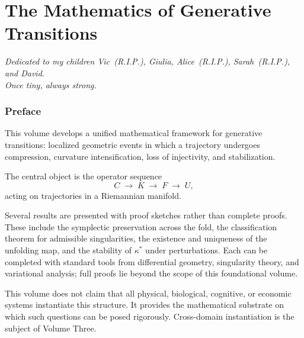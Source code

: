 \documentclass[12pt, oneside]{book}
\theoremstyle{plain}
\theoremstyle{definition}
\theoremstyle{remark}
\begin{document}
\cleardoublepage

\tableofcontents
\cleardoublepage

\mainmatter


\part{The Mathematics of Generative Transitions}

\begin{center}
\emph{Dedicated to my children Vic~(R.I.P.), Giulia,
  Alice~(R.I.P.), Sarah~(R.I.P.), and David.}\\[4pt]
\emph{Once tiny, always strong.}
\end{center}

\vspace{1.5em}

\newpage

\section*{Preface}

This volume develops a unified mathematical framework for generative
transitions: localized geometric events in which a trajectory undergoes
compression, curvature intensification, loss of injectivity, and
stabilization.

The central object is the operator sequence
\[
C \;\rightarrow\; K \;\rightarrow\; F \;\rightarrow\; U,
\]
acting on trajectories in a Riemannian manifold.

Several results are presented with proof sketches rather than complete
proofs. These include the symplectic preservation across the fold, the
classification theorem for admissible singularities, the existence and
uniqueness of the unfolding map, and the stability of $\kappa^*$ under
perturbations. Each can be completed with standard tools from
differential geometry, singularity theory, and variational analysis;
full proofs lie beyond the scope of this foundational volume.

This volume does not claim that all physical, biological, cognitive,
or economic systems instantiate this structure. It provides the
mathematical substrate on which such questions can be posed rigorously.
Cross-domain instantiation is the subject of Volume Three.
\end{document}
